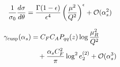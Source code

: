 \begin{equation}
  \frac{1}{\sigma_0} \frac{d\sigma}{d\theta} = \frac{\Gamma(1-\epsilon)}{\epsilon^{4}} \left(\frac{\mu^2}{Q^2}\right)^{\epsilon} + \mathcal{O}(\alpha_s^{2})
  \label{eq:4}
\end{equation}

\begin{align}
  \gamma_{\rm cusp}(\alpha_s) &= C_F C_A P_{qq}(z) \log\frac{\mu_R^2}{Q^2} \nonumber \\
  &\quad + \frac{\alpha_s C_F^2}{\pi} \log^2 e_2^{(2)} + \mathcal{O}(\alpha_s^3) \label{eq:5}
\end{align}

